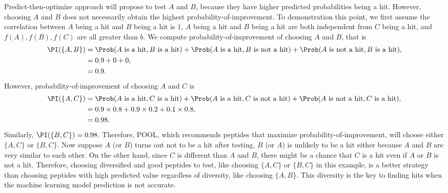 Predict-then-optimize approach will propose to test $A$ and $B$, because they have higher predicted probabilities being a hit. 
However, choosing $A$ and $B$ does not necessarily obtain the highest probability-of-improvement. To demonstration this point, 
we first assume the correlation between $A$ being a hit and $B$ being a hit is $1$, $A$ being a hit and $B$ being a hit 
are both independent from $C$ being a hit, and $f(A), f(B), f(C)$ are all greater than $b$. We compute probability-of-improvement
of choosing $A$ and $B$, that is
\begin{equation*}
\begin{split}
\PI (\{A, B\}) &= \Prob (A \text{ is a hit}, B \text{ is a hit}) + \Prob (A \text{ is a hit}, B \text{ is not a hit}) + \Prob (A \text{ is not a hit}, B \text{ is a hit}), \\
&= 0.9 + 0 + 0, \\
&= 0.9.
\end{split}
\end{equation*}
However, probability-of-improvement of choosing $A$ and $C$ is
\begin{equation*}
\begin{split}
\PI (\{A, C\}) &= \Prob (A \text{ is a hit}, C \text{ is a hit}) + \Prob (A \text{ is a hit}, C \text{ is not a hit}) + \Prob (A \text{ is not a hit}, C \text{ is a hit}), \\
&= 0.9 \times 0.8 + 0.9 \times 0.2 + 0.1 \times 0.8, \\
&= 0.98.
\end{split}
\end{equation*}
Similarly, $\PI(\{B, C\})=0.98$. Therefore, POOL, which recommends peptides that maximize probability-of-improvement, will choose either 
$\{A, C\}$ or $\{B, C\}$. Now suppose $A$ (or $B$) turns out not to be a hit after
testing, $B$ (or $A$) is unlikely to be a hit either because $A$ and $B$ are very similar to each other. On the other hand, since $C$ is 
different than $A$ and $B$, there might be a chance that $C$ is a hit even if $A$ or $B$ is not a hit. 
Therefore, choosing diversified and good peptides to test, like choosing $\{A, C\}$ or $\{B, C\}$ in this example, 
is a better strategy than choosing peptides with high predicted value regardless of diversity, like choosing $\{A, B\}$. This diversity
is the key to finding hits when the machine learning model prediction is not accurate.